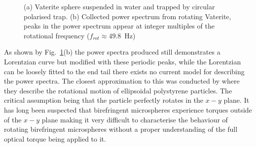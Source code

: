 \begin{figure}[h!]
\begin{subfigure}{0.55\linewidth}
		\subcaption{}
	\end{subfigure}
	\caption{(a) Vaterite sphere suspended in water and trapped by
		 circular polarised trap. (b) Collected power spectrum from 
		 rotating Vaterite, peaks in the power spectrum appear at integer 
		 multiples of the rotational frequency ($f_{rot} \approx 49.8$~Hz)}
	\label{fig:vaterite}
\end{figure}

As shown by Fig.~\ref{fig:vaterite}(b) the power spectra produced still 
demonstrates a Lorentzian curve but modified with these periodic peaks, 
while the Lorentzian can be loosely fitted to the end tail there exists 
no current model for describing the power spectra. The closest approximation
to this was conducted by \cite{Yogesha2012} where they describe the 
rotational motion of ellipsoidal polystyrene particles. The critical 
assumption being that the particle perfectly rotates in the $x-y$ plane. 
It has long been suspected that birefringent microspheres experience torques 
outside of the $x-y$ plane \cite{Volpe2023} making it very difficult to 
characterise the behaviour of rotating birefringent microspheres without a 
proper understanding of the full optical torque being applied to it.


